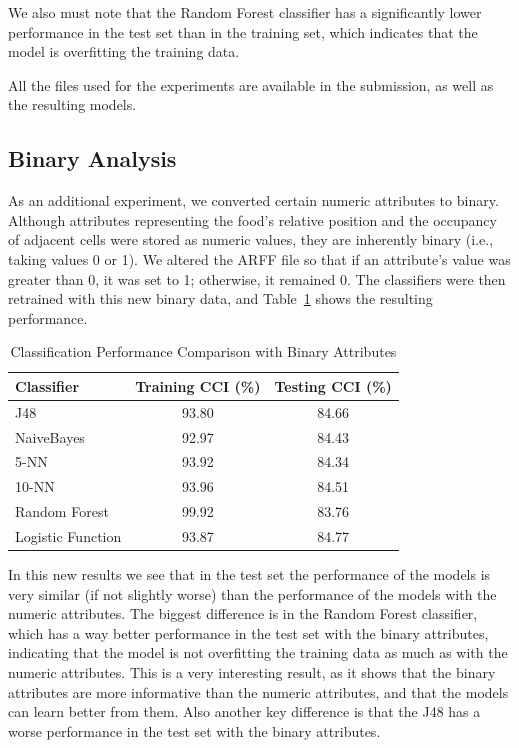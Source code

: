 \documentclass[12pt,a4paper]{article}
\begin{document}
We also must note that the Random Forest classifier has a significantly lower performance in the test set than in the training set, which indicates that the model is overfitting the training data.

All the files used for the experiments are available in the submission, as well as the resulting models.


\subsection{Binary Analysis}
As an additional experiment, we converted certain numeric attributes to binary. Although attributes representing the food's relative position and the occupancy of adjacent cells were stored as numeric values, they are inherently binary (i.e., taking values 0 or 1). We altered the ARFF file so that if an attribute's value was greater than 0, it was set to 1; otherwise, it remained 0. The classifiers were then retrained with this new binary data, and Table~\ref{tab:binary} shows the resulting performance.

\begin{table}[ht]
\centering
\caption{Classification Performance Comparison with Binary Attributes}
\label{tab:binary}
\begin{tabular}{lcc}
\hline
\textbf{Classifier} & \textbf{Training CCI (\%)} & \textbf{Testing CCI (\%)} \\ \hline
J48               & 93.80                       & 84.66                     \\
NaiveBayes        & 92.97                       & 84.43                     \\
5-NN              & 93.92                       & 84.34                     \\
10-NN             & 93.96                       & 84.51                     \\
Random Forest     & 99.92                       & 83.76                     \\ 
Logistic Function & 93.87                       & 84.77                     \\\hline
\end{tabular}
\end{table}


In this new results we see that in the test set the performance of the models is very similar (if not slightly worse) than the performance of the models with the numeric attributes.
The biggest difference is in the Random Forest classifier, which has a way better performance in the test set with the binary attributes, 
indicating that the model is not overfitting the training data as much as with the numeric attributes.
This is a very interesting result, as it shows that the binary attributes are more informative than the numeric attributes, and that the models can learn better from them.
Also another key difference is that the J48 has a worse performance in the test set with the binary attributes. 
\end{document}
